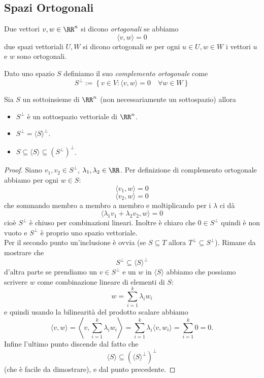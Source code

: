 \documentclass[11pt]{scrartcl}
\begin{document}
   	 \subsection{Spazi Ortogonali}
   	 \begin{definition}
   	 	Due vettori $v,w\in\RR^n$ si dicono \textit{ortogonali} se abbiamo
   	 	$$\langle v,w\rangle =0$$
   	 	due spazi vettoriali $U,W$ si dicono ortogonali se per ogni $u\in U, w\in W$ i vettori $u$ e $w$ sono ortogonali.  
   	 \end{definition}
   	 \begin{definition}
   	 	Dato uno spazio $S$ definiamo il suo \textit{complemento ortogonale} come 
   	 	$$S^\perp:=\left\{v\in V : \langle v,w\rangle = 0 \quad\forall w\in W \right\}$$
   	 \end{definition}
   	 \begin{proposition}
   	 	Sia $S$ un sottoinsieme di $\RR^n$ (non necessariamente un sottospazio) allora 
   	 	\begin{itemize}
   	 		\item  $S^\perp$ è un sottospazio vettoriale di $\RR^n$.
   	 		\item $S^\perp = \langle S\rangle^\perp$.
   	 		\item $S\subseteq \langle S \rangle \subseteq \left(S^\perp\right)^\perp$. 
   	 	\end{itemize}
   	 \end{proposition}
   	 \begin{proof}
   	 	Siano $v_1,v_2\in S^\perp$, $\lambda_1,\lambda_2\in \RR$. Per definizione di complemento ortogonale abbiamo per ogni $w\in S$:
   	 	$$\langle v_1, w \rangle=0$$
   	 	$$\langle v_2, w \rangle=0$$
   	 	che sommando membro a membro a membro e moltiplicando per i $\lambda$ ci dà
   	 	$$\langle \lambda_1v_1+\lambda_2v_2,w \rangle =0$$
   	 	cioè $S^\perp$ è chiuso per combinazioni lineari. Inoltre è chiaro che $0\in S^\perp$ quindi è non vuoto e $S^\perp$ è proprio uno spazio vettoriale. \\
   	 	Per il secondo punto un'inclusione è ovvia (se $S\subseteq T$ allora $T^\perp \subseteq S^\perp$). Rimane da mostrare che 
   	 	$$S^\perp \subseteq \langle S \rangle^\perp$$
   	 	d'altra parte se prendiamo un $v\in S^\perp$ e un $w$ in $\langle S \rangle$ abbiamo che possiamo scrivere $w$ come combinazione lineare di elementi di $S$:
   	 	$$w=\sum_{i=1}^k \lambda_i w_i$$
   	 	e quindi usando la bilinearità del prodotto scalare abbiamo
   	 	$$\langle v,w\rangle = \left\langle v,\sum_{i=1}^k \lambda_i w_i\right\rangle=\sum_{i=1}^k\lambda_i\langle v,w_i \rangle=\sum_{i=1}^k 0 =0.$$
   	 	Infine l'ultimo punto discende dal fatto che 
   	 	$$\langle S \rangle \subseteq \left(\langle S\rangle^\perp\right)^\perp$$
   	 	(che è facile da dimostrare), e dal punto precedente.
   	 \end{proof}
   	 
\end{document}
